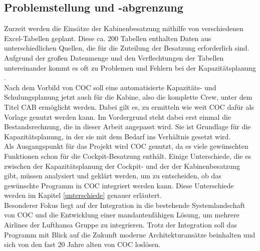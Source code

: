 \documentclass [12pt, a4paper, oneside, titlepage, ngerman]{article}
\begin{document}
\subsection {Problemstellung und -abgrenzung}
Zurzeit werden die Einsätze der Kabinenbesatzung mithilfe von verschiedenen Excel-Tabellen geplant. Diese ca. 200 Tabellen enthalten Daten aus unterschiedlichen Quellen, die für die Zuteilung der Besatzung erforderlich sind. Aufgrund der großen Datenmenge und den Verflechtungen der Tabellen untereinander kommt es oft zu Problemen und Fehlern bei der Kapazitätsplanung \cite[vgl.][]{Gespraech2}. \\ 

\noindent Nach dem Vorbild von \ac{COC} soll eine automatisierte Kapazitäts- und Schulungsplanung jetzt auch für die Kabine, also die komplette Crew, unter dem Titel \ac{CAB} ermöglicht werden. Dabei gilt es, zu ermitteln wie weit \ac{COC} dafür als Vorlage genutzt werden kann.  Im Vordergrund steht dabei erst einmal die Bestandsrechnung, die in dieser Arbeit angepasst wird. Sie ist Grundlage für die Kapazitätsplanung, in der sie mit dem Bedarf ins Verhältnis gesetzt wird.\\ %
Als Ausgangspunkt für das Projekt wird \ac{COC} genutzt, da es viele gewünschten Funktionen schon für die Cockpit-Besatzung enthält. Einige Unterschiede, die es zwischen der Kapazitätsplanung der Cockpit- und der der Kabinenbesatzung gibt, müssen analysiert und geklärt werden, um zu entscheiden, ob das gewünschte Programm in \ac{COC} integriert werden kann. Diese Unterschiede werden im Kapitel \ref{unterschiede} genauer erläutert. %
\\

\noindent Besonderer Fokus liegt auf der Integration in die bestehende Systemlandschaft von \ac{COC} und die Entwicklung einer mandantenfähigen Lösung, um mehrere Airlines der Lufthansa Gruppe zu integrieren. Trotz der Integration soll das Programm mit Blick auf die Zukunft moderne Architekturansätze beinhalten und sich von den fast 20 Jahre alten von \ac{COC} loslösen.
\\%
\end{document}

